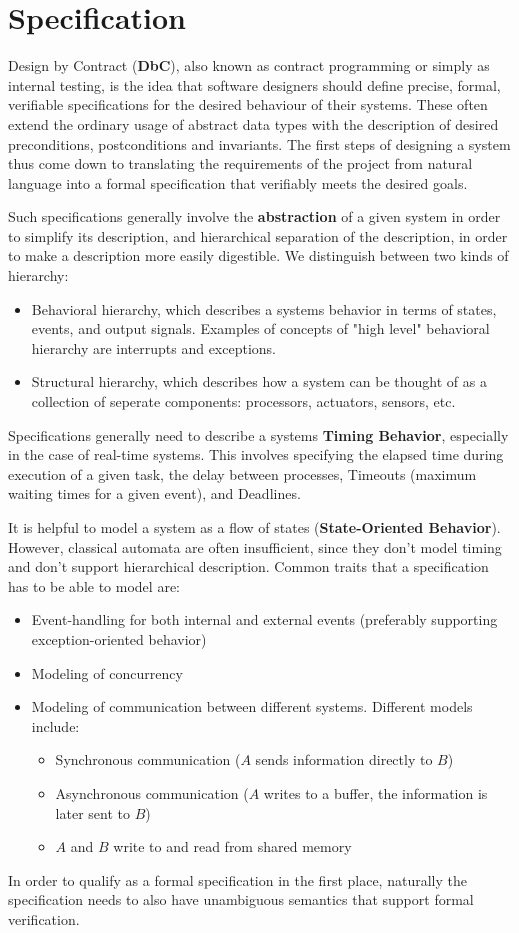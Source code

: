 \documentclass{report}
\newcommand{\tbf}{\textbf}
\newcommand*{\newpar}{\par\vspace{\baselineskip}\noindent} %
\begin{document}
\chapter{Specification}
\thispagestyle{fancy}
Design by Contract (\tbf{DbC}), also known as contract programming or simply as internal testing, is the idea that software designers should define precise, formal, verifiable specifications for the desired behaviour of their systems. These often extend the ordinary usage of abstract data types with the description of desired preconditions, postconditions and invariants. The first steps of designing a system thus come down to translating the requirements of the project from natural language into a formal specification that verifiably meets the desired goals.
\newpar
Such specifications generally involve the \tbf{abstraction} of a given system in order to simplify its description, and hierarchical separation of the description, in order to make a description more easily digestible. We distinguish between two kinds of hierarchy:
\begin{itemize}
    \item Behavioral hierarchy, which describes a systems behavior in terms of states, events, and output signals. Examples of concepts of "high level" behavioral hierarchy are interrupts and exceptions.
    \item Structural hierarchy, which describes how a system can be thought of as a collection of seperate components: processors, actuators, sensors, etc.
\end{itemize}
Specifications generally need to describe a systems \tbf{Timing Behavior}, especially in the case of real-time systems. This involves specifying the elapsed time during execution of a given task, the delay between processes, Timeouts (maximum waiting times for a given event), and Deadlines.
\newpar
It is helpful to model a system as a flow of states (\tbf{State-Oriented Behavior}). However, classical automata are often insufficient, since they don't model timing and don't support hierarchical description. Common traits that a specification has to be able to model are:
\begin{itemize}
 \item Event-handling for both internal and external events (preferably supporting exception-oriented behavior)
 \item Modeling of concurrency
 \item Modeling of communication between different systems. Different models include:
 \begin{itemize}
  \item Synchronous communication ($A$ sends information directly to $B$)
  \item Asynchronous communication ($A$ writes to a buffer, the information is later sent to $B$)
  \item $A$ and $B$ write to and read from shared memory
 \end{itemize}
\end{itemize}
In order to qualify as a formal specification in the first place, naturally the specification needs to also have unambiguous semantics that support formal verification.
%
\end{document}
